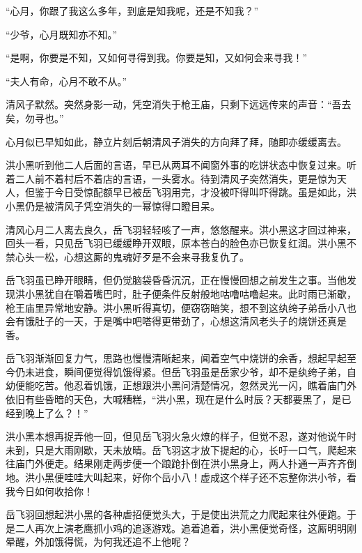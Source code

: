 “心月，你跟了我这么多年，到底是知我呢，还是不知我？”

“少爷，心月既知亦不知。”

“是啊，你要是不知，又如何寻得到我。你要是知，又如何会来寻我！”

“夫人有命，心月不敢不从。”

清风子默然。突然身影一动，凭空消失于枪王庙，只剩下远远传来的声音：“吾去矣，勿寻也。”

心月似已早知如此，静立片刻后朝清风子消失的方向拜了拜，随即亦缓缓离去。

洪小黑听到他二人后面的言语，早已从两耳不闻窗外事的吃饼状态中恢复过来。听着二人前不着村后不着店的言语，一头雾水。待到清风子突然消失，更是惊为天人，但鉴于今日受惊配额早已被岳飞羽用完，才没被吓得叫吓得跳。虽是如此，洪小黑仍是被清风子凭空消失的一幂惊得口瞪目呆。

清风心月二人离去良久，岳飞羽轻轻咳了一声，悠悠醒来。洪小黑这才回过神来，回头一看，只见岳飞羽已缓缓睁开双眼，原本苍白的脸色亦已恢复红润。洪小黑不禁心头一松，心想这厮的鬼魂好歹是不会来寻我复仇了。

岳飞羽虽已睁开眼睛，但仍觉脑袋昏昏沉沉，正在慢慢回想之前发生之事。当他发现洪小黑犹自在嚼着嘴巴时，肚子便条件反射般地咕噜咕噜起来。此时雨已渐歇，枪王庙里异常地安静。洪小黑听得真切，便窃窃暗笑，想不到这纨绔子弟岳小八也会有饿肚子的一天，于是嘴中吧嗒得更带劲了，心想这清风老头子的烧饼还真是香。

岳飞羽渐渐回复力气，思路也慢慢清晰起来，闻着空气中烧饼的余香，想起早起至今仍未进食，瞬间便觉得饥饿得紧。但岳飞羽虽是岳家少爷，却不是纨绔子弟，自幼便能吃苦。他忍着饥饿，正想跟洪小黑问清楚情况，忽然灵光一闪，瞧着庙门外依旧有些昏暗的天色，大喊糟糕，“洪小黑，现在是什么时辰？天都要黑了，是已经到晚上了么？！”

洪小黑本想再捉弄他一回，但见岳飞羽火急火燎的样子，但觉不忍，遂对他说午时未到，只是大雨刚歇，天未放晴。岳飞羽这才放下提起的心，长吁一口气，爬起来往庙门外便走。结果刚走两步便一个踉跄扑倒在洪小黑身上，两人扑通一声齐齐倒地。洪小黑便哇哇大叫起来，好你个岳小八！虚成这个样子还不忘整你洪小爷，看我今日如何收拾你！

岳飞羽回想起洪小黑的各种虐招便觉头大，于是使出洪荒之力爬起来往外便跑。于是二人再次上演老鹰抓小鸡的追逐游戏。追着追着，洪小黑便觉奇怪，这厮明明刚晕醒，外加饿得慌，为何我还追不上他呢？

